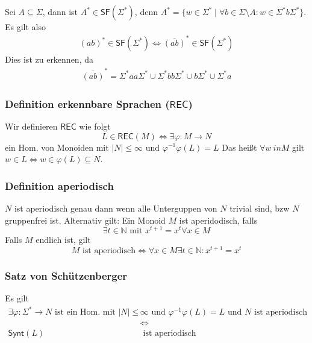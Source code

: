 \documentclass[12pt, german]{article}
\newcommand{\N}{\mathbb{N}}
\newcommand{\sigstern}{\Sigma^\ast}
\newcommand{\inv}{^{-1}}
\newcommand{\rec}{\mathsf{REC}}
\newcommand{\starfree}{\mathsf{SF}}
\newcommand{\synt}{\mathsf{Synt}}
\begin{document}
	Sei $A\subseteq \Sigma$, dann ist $A^\ast \in \starfree(\sigstern)$, denn $A^\ast = \{ w \in \sigstern \mid \forall b \in \Sigma \setminus A : w \in \sigstern b\sigstern\}$. Es gilt also 
	\begin{align*}
		(ab)^\ast \in \starfree(\sigstern) \iff \overline{(ab)}^\ast\in \starfree(\sigstern)
	\end{align*}
	Dies ist zu erkennen, da  
	\begin{align*}
		\overline{(ab)}^\ast = \sigstern aa \sigstern \cup \sigstern bb \sigstern \cup b\sigstern \cup \sigstern a
	\end{align*}
	
	
	
	\subsubsection{Definition erkennbare Sprachen ($\rec$)}
	Wir definieren $\rec$ wie folgt  $$L \in \rec(M) \iff \exists \varphi : M \to N$$ ein Hom. von Monoiden mit $|N| \leq \infty$ und $\varphi\inv\varphi(L) = L$
	Das heißt $\forall w \ in M$ gilt $w\in L \iff w \in \varphi(L) \subseteq N$.
	
	\subsubsection{Definition aperiodisch}
	$N$ ist aperiodisch genau dann wenn alle Unterguppen von $N$ trivial sind, bzw $N$ gruppenfrei ist.
	Alternativ gilt: Ein Monoid $M$	ist aperidodisch, falls $$\exists t \in \N \text{ mit } x^{t+1} = x^t \forall x \in M$$
	Falls $M$ endlich ist, gilt $$M \text{ ist aperiodisch} \iff \forall x \in M \exists t \in \N : x^{t+1} = x^t$$
	
	
	\subsubsection{Satz von Schützenberger}
	Es gilt 
	\begin{align*}
		\exists \varphi: \sigstern \to N \text{ ist ein Hom. mit } |N| \leq &\infty \text{ und } \varphi\inv\varphi(L) = L \text{ und $N$ ist aperiodisch} \\ 
		&\iff \\
		\synt(L) &\text{ ist aperiodisch}
	\end{align*}
	
\end{document}
